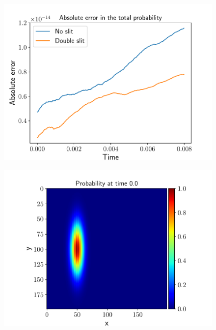 \documentclass[english,notitlepage,reprint,nofootinbib]{revtex4-2}  %
\begin{document}
	\begin{figure}[h!]
		\centering
		\includegraphics[scale=0.55]{figures/problem7_error.pdf}
		\caption{}
		\label{fig:prob7_error}
	\end{figure}

	\begin{figure}[h!]
		\centering
		\includegraphics[scale=0.55]{figures/prob_plot_0.0.pdf}
		\caption{}
		\label{fig:prob_P0}
	\end{figure}
\end{document}
